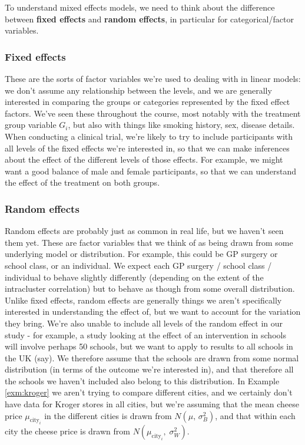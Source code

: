 \documentclass[
  openany]{book}
\theoremstyle{definition}
\theoremstyle{definition}
\theoremstyle{definition}
\theoremstyle{definition}
\theoremstyle{remark}
\begin{document}
To understand mixed effects models, we need to think about the difference between \textbf{fixed effects} and \textbf{random effects}, in particular for categorical/factor variables.

\subsubsection*{Fixed effects}\label{fixed-effects}

These are the sorts of factor variables we're used to dealing with in linear models: we don't assume any relationship between the levels, and we are generally interested in comparing the groups or categories represented by the fixed effect factors. We've seen these throughout the course, most notably with the treatment group variable \(G_i\), but also with things like smoking history, sex, disease details. When conducting a clinical trial, we're likely to try to include participants with all levels of the fixed effects we're interested in, so that we can make inferences about the effect of the different levels of those effects. For example, we might want a good balance of male and female participants, so that we can understand the effect of the treatment on both groups.

\subsubsection*{Random effects}\label{random-effects}

Random effects are probably just as common in real life, but we haven't seen them yet. These are factor variables that we think of as being drawn from some underlying model or distribution. For example, this could be GP surgery or school class, or an individual. We expect each GP surgery / school class / individual to behave slightly differently (depending on the extent of the intracluster correlation) but to behave as though from some overall distribution. Unlike fixed effects, random effects are generally things we aren't specifically interested in understanding the effect of, but we want to account for the variation they bring. We're also unable to include all levels of the random effect in our study - for example, a study looking at the effect of an intervention in schools will involve perhaps 50 schools, but we want to apply to results to all schools in the UK (say). We therefore assume that the schools are drawn from some normal distribution (in terms of the outcome we're interested in), and that therefore all the schools we haven't included also belong to this distribution. In Example \ref{exm:kroger} we aren't trying to compare different cities, and we certainly don't have data for Kroger stores in all cities, but we're assuming that the mean cheese price \(\mu_{\text{city}_i}\) in the different cities is drawn from \(N\left(\mu,\,\sigma^2_B\right)\), and that within each city the cheese price is drawn from \(N\left(\mu_{\text{city}_i},\;\sigma^2_W\right)\).
\end{document}
